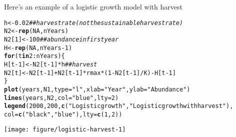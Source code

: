 \documentclass[12pt]{article}\usepackage[]{graphicx}\usepackage[]{xcolor}
\makeatletter
\newcommand{\hlnum}[1]{\textcolor[rgb]{0.686,0.059,0.569}{#1}}%
\newcommand{\hlsng}[1]{\textcolor[rgb]{0.192,0.494,0.8}{#1}}%
\newcommand{\hlcom}[1]{\textcolor[rgb]{0.678,0.584,0.686}{\textit{#1}}}%
\newcommand{\hlopt}[1]{\textcolor[rgb]{0,0,0}{#1}}%
\newcommand{\hldef}[1]{\textcolor[rgb]{0.345,0.345,0.345}{#1}}%
\newcommand{\hlkwa}[1]{\textcolor[rgb]{0.161,0.373,0.58}{\textbf{#1}}}%
\newcommand{\hlkwb}[1]{\textcolor[rgb]{0.69,0.353,0.396}{#1}}%
\newcommand{\hlkwc}[1]{\textcolor[rgb]{0.333,0.667,0.333}{#1}}%
\newcommand{\hlkwd}[1]{\textcolor[rgb]{0.737,0.353,0.396}{\textbf{#1}}}%
\newenvironment{kframe}{%
 \def\at@end@of@kframe{}%
 \ifinner\ifhmode%
  \def\at@end@of@kframe{\end{minipage}}%
  \begin{minipage}{\columnwidth}%
 \fi\fi%
 \def\FrameCommand##1{\hskip\@totalleftmargin \hskip-\fboxsep
 \colorbox{shadecolor}{##1}\hskip-\fboxsep
     \hskip-\linewidth \hskip-\@totalleftmargin \hskip\columnwidth}%
 \MakeFramed {\advance\hsize-\width
   \@totalleftmargin\z@ \linewidth\hsize
   \@setminipage}}%
 {\par\unskip\endMakeFramed%
 \at@end@of@kframe}
\newenvironment{knitrout}{}{} %
\makeatother
\begin{document}


Here's an example of a logistic growth model with harvest
\begin{knitrout}\small
{}\color{fgcolor}\begin{kframe}
\begin{alltt}
\hldef{h} \hlkwb{<-} \hlnum{0.02}                \hlcom{## harvest rate (not the sustainable harvest rate)}
\hldef{N2} \hlkwb{<-} \hlkwd{rep}\hldef{(}\hlnum{NA}\hldef{, nYears)}
\hldef{N2[}\hlnum{1}\hldef{]} \hlkwb{<-} \hlnum{100}             \hlcom{## abundance in first year}
\hldef{H} \hlkwb{<-} \hlkwd{rep}\hldef{(}\hlnum{NA}\hldef{, nYears}\hlopt{-}\hlnum{1}\hldef{)}
\hlkwa{for}\hldef{(t} \hlkwa{in} \hlnum{2}\hlopt{:}\hldef{nYears) \{}
    \hldef{H[t}\hlopt{-}\hlnum{1}\hldef{]} \hlkwb{<-} \hldef{N2[t}\hlopt{-}\hlnum{1}\hldef{]}\hlopt{*}\hldef{h}  \hlcom{## harvest}
    \hldef{N2[t]} \hlkwb{<-} \hldef{N2[t}\hlopt{-}\hlnum{1}\hldef{]} \hlopt{+} \hldef{N2[t}\hlopt{-}\hlnum{1}\hldef{]}\hlopt{*}\hldef{rmax}\hlopt{*}\hldef{(}\hlnum{1} \hlopt{-} \hldef{N2[t}\hlopt{-}\hlnum{1}\hldef{]}\hlopt{/}\hldef{K)} \hlopt{-} \hldef{H[t}\hlopt{-}\hlnum{1}\hldef{]}
\hldef{\}}
\hlkwd{plot}\hldef{(years, N1,} \hlkwc{type}\hldef{=}\hlsng{"l"}\hldef{,} \hlkwc{xlab}\hldef{=}\hlsng{"Year"}\hldef{,} \hlkwc{ylab}\hldef{=}\hlsng{"Abundance"}\hldef{)}
\hlkwd{lines}\hldef{(years, N2,} \hlkwc{col}\hldef{=}\hlsng{"blue"}\hldef{,} \hlkwc{lty}\hldef{=}\hlnum{2}\hldef{)}
\hlkwd{legend}\hldef{(}\hlnum{2000}\hldef{,} \hlnum{200}\hldef{,} \hlkwd{c}\hldef{(}\hlsng{"Logistic growth"}\hldef{,} \hlsng{"Logistic growth with harvest"}\hldef{),}
       \hlkwc{col}\hldef{=}\hlkwd{c}\hldef{(}\hlsng{"black"}\hldef{,} \hlsng{"blue"}\hldef{),} \hlkwc{lty}\hldef{=}\hlkwd{c}\hldef{(}\hlnum{1}\hldef{,}\hlnum{2}\hldef{))}
\end{alltt}
\end{kframe}

{\centering \texttt{[image: figure/logistic-harvest-1]} 

}


\end{knitrout}
\end{document}

